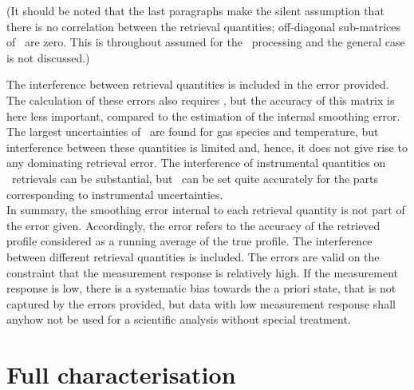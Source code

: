 (It should be noted that the last paragraphs make the silent assumption that
there is no correlation between the retrieval quantities; off-diagonal
sub-matrices of \aCvrMtr{\VctStl{\SttVct}}\ are zero. This is throughout
assumed for the \SMR\ processing and the general case is not discussed.)

The interference between retrieval quantities is included in the error
provided. The calculation of these errors also requires \aCvrMtr{\SttVct}, but
the accuracy of this matrix is here less important, compared to the estimation
of the internal smoothing error. The largest uncertainties of
\aCvrMtr{\SttVct}\ are found for gas species and temperature, but interference
between these quantities is limited and, hence, it does not give rise to any
dominating retrieval error. The interference of instrumental quantities on
\VMR\ retrievals can be substantial, but \aCvrMtr{\SttVct}\ can be
set quite accurately for the parts corresponding to instrumental uncertainties.\\

\noindent
In summary, the smoothing error internal to each retrieval quantity is not part
of the error given. Accordingly, the error refers to the accuracy of the
retrieved profile considered as a running average of the true profile. The
interference between different retrieval quantities is included. The errors are
valid on the constraint that the measurement response is relatively high. If
the measurement response is low, there is a systematic bias towards the a
priori state, that is not captured by the errors provided, but data with
low measurement response shall anyhow not be used for a scientific analysis
without special treatment\addref.



\section{Full characterisation}
%


